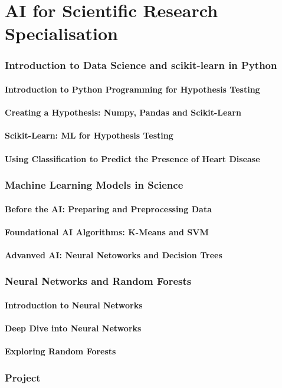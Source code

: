 \part{AI for Scientific Research Specialisation}

\section{Introduction to Data Science and scikit-learn in Python}
\subsection{Introduction to Python Programming for Hypothesis Testing}
\subsection{Creating a Hypothesis: Numpy, Pandas and Scikit-Learn}
\subsection{Scikit-Learn: ML for Hypothesis Testing}
\subsection{Using Classification to Predict the Presence of Heart Disease}

\section{Machine Learning Models in Science}
\subsection{Before the AI: Preparing and Preprocessing Data}
\subsection{Foundational AI Algorithms: K-Means and SVM}
\subsection{Advanved AI: Neural Netoworks and Decision Trees}

\section{Neural Networks and Random Forests}
\subsection{Introduction to Neural Networks}
\subsection{Deep Dive into Neural Networks}
\subsection{Exploring Random Forests}

\section{Project}